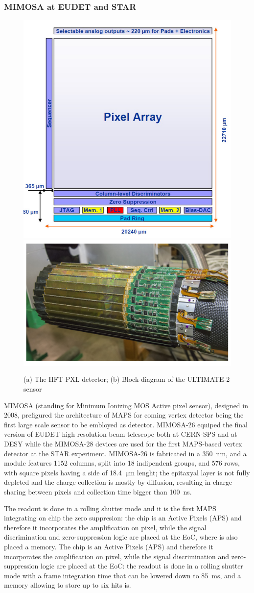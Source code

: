     \subsubsection{MIMOSA at EUDET and STAR}
        \begin{figure}    
        \centering
            \includegraphics[width=.49\linewidth]{figures/pixel_detectors_usage/MIMOSA.png}
            \includegraphics[width=.49\linewidth]{figures/pixel_detectors_usage/STAR.png}
            \caption{(a) The HFT PXL detector; (b) Block-diagram of the ULTIMATE-2 sensor}
            \label{fig:}
        \end{figure}
        MIMOSA \cite{MIMOSA}\cite{MIMOSA26} (standing for Minimum Ionizing MOS Active pixel sensor), designed in 2008, prefigured the architecture of MAPS for coming vertex detector being the first large scale sensor to be embloyed as detector. MIMOSA-26 equiped the final version of EUDET high resolution  beam telescope both at CERN-SPS and at DESY while the MIMOSA-28 devices are used for the first MAPS-based vertex detector at the STAR experiment.
        MIMOSA-26 is fabricated in a \SI{350}{nm}, and a module features 1152 columns, split into 18 indipendent groups, and 576 rows, with square pixels having a side of \SI{18.4}{\um} lenght; the epitaxyal layer is not fully depleted and the charge collection is mostly by diffusion, resulting in charge sharing between pixels and collection time bigger than \SI{100}{ns}.

        The readout is done in a rolling shutter mode and it is the first MAPS integrating on chip the zero suppresion: the chip is an Active Pixels (APS) and therefore it incorporates the amplification on pixel, while the signal discrimination and zero-suppression logic are placed at the EoC, where is also placed a memory.
        The chip is an Active Pixels (APS) and therefore it incorporates the amplification on pixel, while the signal discrimination and zero-suppression logic are placed at the EoC: the readout is done in a rolling shutter mode with a frame integration time that can be lowered down to \SI{85}{ms}, and a memory allowing to store up to six hits is. 

